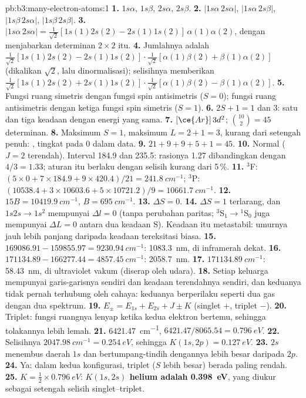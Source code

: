 \begin{solution}{pb:b3:many-electron-atoms:1}
\textbf{1.} $1s\alpha$, $1s\beta$, $2s\alpha$, $2s\beta$.
\textbf{2.} $|1s\alpha\,2s\alpha|$, $|1s\alpha\,2s\beta|$, $|1s\beta\,2s\alpha|$,
$|1s\beta\,2s\beta|$.
\textbf{3.} $|1s\alpha\,2s\alpha| = \frac{1}{\sqrt2}[1s(1)2s(2) - 2s(1)1s(2)]\,
\alpha(1)\alpha(2)$, dengan menjabarkan determinan $2\times2$ itu.
\textbf{4.} Jumlahnya adalah $\frac{1}{\sqrt2}[1s(1)2s(2) - 2s(1)1s(2)]\cdot
\frac{1}{\sqrt2}[\alpha(1)\beta(2) + \beta(1)\alpha(2)]$ (dikalikan $\sqrt2$, lalu
dinormalisasi); selisihnya memberikan $\frac{1}{\sqrt2}[1s(1)2s(2) +
2s(1)1s(2)]\cdot\frac{1}{\sqrt2}[\alpha(1)\beta(2) - \beta(1)\alpha(2)]$.
\textbf{5.} Fungsi ruang simetris dengan fungsi spin antisimetris ($S = 0$);
fungsi ruang antisimetris dengan ketiga fungsi spin simetris ($S = 1$).
\textbf{6.} $2S + 1 = 1$ dan 3: satu dan tiga keadaan dengan energi yang sama.
\textbf{7.} $[\ce{Ar}]\,3d^2$; $\binom{10}{2} = 45$ determinan.
\textbf{8.} Maksimum $S = 1$, maksimum $L = 2 + 1 = 3$, kurang dari
setengah penuh: , tingkat pada 0 dalam data.
\textbf{9.} $21 + 9 + 9 + 5 + 1 = 45$.
\textbf{10.} Normal ($J = 2$ terendah). Interval 184.9 dan 235.5: rasionya
1.27 dibandingkan dengan $4/3 = 1.33$; aturan itu berlaku dengan selisih
kurang dari 5\,\%.
\textbf{11.} ${}^3$F: $(5 \times 0 + 7 \times 184.9 + 9 \times 420.4)/21 =
\qty{241.8}{cm^{-1}}$; ${}^3$P: $(10538.4 + 3 \times 10603.6 + 5 \times
10721.2)/9 = \qty{10661.7}{cm^{-1}}$.
\textbf{12.} $15B = \qty{10419.9}{cm^{-1}}$, $B = \qty{695}{cm^{-1}}$.
\textbf{13.} $\Delta S = 0$.
\textbf{14.} $\Delta S = 1$ terlarang, dan $1s2s \to 1s^2$ mempunyai $\Delta l = 0$
(tanpa perubahan paritas; ${}^3$S$_1 \to {}^1$S$_0$ juga mempunyai $\Delta L = 0$
antara dua keadaan S). Keadaan itu metastabil: umurnya jauh lebih panjang
daripada keadaan tereksitasi biasa.
\textbf{15.} $169086.91 - 159855.97 = \qty{9230.94}{cm^{-1}}$: \qty{1083.3}{nm},
di inframerah dekat.
\textbf{16.} $171134.89 - 166277.44 = \qty{4857.45}{cm^{-1}}$: \qty{2058.7}{nm}.
\textbf{17.} $\qty{171134.89}{cm^{-1}}$: \qty{58.43}{nm}, di ultraviolet vakum
(diserap oleh udara).
\textbf{18.} Setiap keluarga mempunyai garis-garisnya sendiri dan keadaan
terendahnya sendiri, dan keduanya tidak pernah terhubung oleh cahaya:
keduanya berperilaku seperti dua gas dengan dua spektrum.
\textbf{19.} $E_\pm = E_{1s} + E_{2s} + J \pm K$ (singlet $+$, triplet $-$).
\textbf{20.} Triplet: fungsi ruangnya lenyap ketika kedua elektron bertemu,
sehingga tolakannya lebih lemah.
\textbf{21.} \qty{6421.47}{cm^{-1}}, $6421.47/8065.54 = \qty{0.796}{eV}$.
\textbf{22.} Selisihnya $\qty{2047.98}{cm^{-1}} = \qty{0.254}{eV}$, sehingga
$K(1s,2p) =
\qty{0.127}{eV}$.
\textbf{23.} $2s$ menembus daerah $1s$ dan bertumpang-tindih dengannya lebih
besar daripada $2p$.
\textbf{24.} Ya: dalam kedua konfigurasi, triplet ($S$ lebih besar) berada
paling rendah.
\textbf{25.} $K = \frac12 \times \qty{0.796}{eV}$: \textbf{
$K(1s,2s)$ helium adalah \qty{0.398}{eV}}, yang diukur sebagai setengah
selisih singlet--triplet.
\end{solution}
